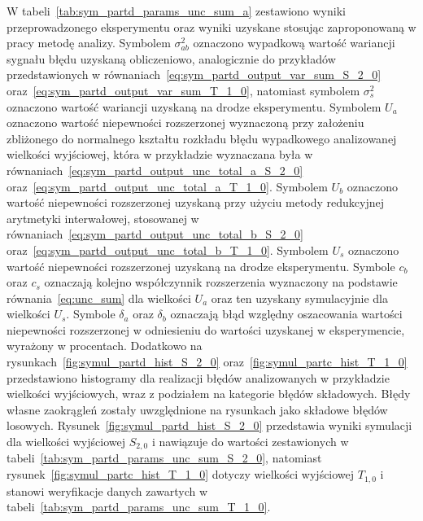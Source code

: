 W tabeli~\ref{tab:sym_partd_params_unc_sum_a} zestawiono wyniki przeprowadzonego eksperymentu oraz wyniki uzyskane stosując zaproponowaną w pracy metodę analizy. Symbolem $\sigma_{ab}^{2}$ oznaczono wypadkową wartość wariancji sygnału błędu uzyskaną obliczeniowo, analogicznie do przykładów przedstawionych w równaniach~\eqref{eq:sym_partd_output_var_sum_S_2_0} oraz~\eqref{eq:sym_partd_output_var_sum_T_1_0}, natomiast symbolem $\sigma_{s}^{2}$ oznaczono wartość wariancji uzyskaną na drodze eksperymentu. Symbolem $U_{a}$ oznaczono wartość niepewności rozszerzonej wyznaczoną przy założeniu zbliżonego do normalnego kształtu rozkładu błędu wypadkowego analizowanej wielkości wyjściowej, która w przykładzie wyznaczana była w równaniach~\eqref{eq:sym_partd_output_unc_total_a_S_2_0} oraz~\eqref{eq:sym_partd_output_unc_total_a_T_1_0}. Symbolem $U_{b}$ oznaczono wartość niepewności rozszerzonej uzyskaną przy użyciu metody redukcyjnej arytmetyki interwałowej, stosowanej w równaniach~\eqref{eq:sym_partd_output_unc_total_b_S_2_0} oraz~\eqref{eq:sym_partd_output_unc_total_b_T_1_0}. Symbolem $U_{s}$ oznaczono wartość niepewności rozszerzonej uzyskaną na drodze eksperymentu. Symbole $c_{b}$ oraz $c_{s}$ oznaczają kolejno współczynnik rozszerzenia wyznaczony na podstawie równania~\eqref{eq:unc_sum} dla wielkości $U_{a}$ oraz ten uzyskany symulacyjnie dla wielkości $U_{s}$. Symbole $\delta_{a}$ oraz $\delta_{b}$ oznaczają błąd względny oszacowania wartości niepewności rozszerzonej w odniesieniu do wartości uzyskanej w eksperymencie, wyrażony w procentach. Dodatkowo na rysunkach~\ref{fig:symul_partd_hist_S_2_0} oraz~\ref{fig:symul_partc_hist_T_1_0} przedstawiono histogramy dla realizacji błędów analizowanych w przykładzie wielkości wyjściowych, wraz z podziałem na kategorie błędów składowych. Błędy własne zaokrągleń zostały uwzględnione na rysunkach jako składowe błędów losowych. Rysunek~\ref{fig:symul_partd_hist_S_2_0} przedstawia wyniki symulacji dla wielkości wyjściowej $S_{2,0}$ i nawiązuje do wartości zestawionych w tabeli~\ref{tab:sym_partd_params_unc_sum_S_2_0}, natomiast rysunek~\ref{fig:symul_partc_hist_T_1_0} dotyczy wielkości wyjściowej $T_{1,0}$ i stanowi weryfikacje danych zawartych w tabeli~\ref{tab:sym_partd_params_unc_sum_T_1_0}.

